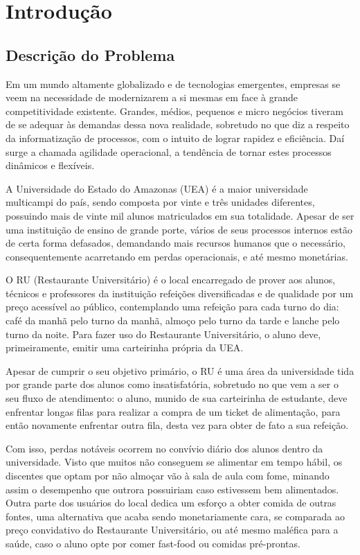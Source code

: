 \chapter{Introdução}


\section{Descrição do Problema}

Em um mundo altamente globalizado e de tecnologias emergentes, empresas se veem na necessidade de modernizarem a si mesmas em face à grande competitividade existente. Grandes, médios, pequenos e micro negócios tiveram de se adequar às demandas dessa nova realidade, sobretudo no que diz a respeito da informatização de processos, com o intuito de lograr rapidez e eficiência. Daí surge a chamada agilidade operacional, a tendência de tornar estes processos dinâmicos e flexíveis.

A Universidade do Estado do Amazonas (UEA) é a maior universidade multicampi do país, sendo composta por vinte e três unidades diferentes, possuindo mais de vinte mil alunos matriculados em sua totalidade. Apesar de ser uma instituição de ensino de grande porte, vários de seus processos internos estão de certa forma defasados, demandando mais recursos humanos que o necessário, consequentemente acarretando em perdas operacionais, e até mesmo monetárias. 

O RU (Restaurante Universitário) é o local encarregado de prover aos alunos, técnicos e professores da instituição refeições diversificadas e de qualidade por um preço acessível ao público, contemplando uma refeição para cada turno do dia: café da manhã pelo turno da manhã, almoço pelo turno da tarde e lanche pelo turno da noite. Para fazer uso do Restaurante Universitário, o aluno deve, primeiramente, emitir uma carteirinha própria da UEA.

Apesar de cumprir o seu objetivo primário, o RU é uma área da universidade tida por grande parte dos alunos como insatisfatória, sobretudo no que vem a ser o seu fluxo de atendimento: o aluno, munido de sua carteirinha de estudante, deve enfrentar longas filas para realizar a compra de um ticket de alimentação, para então novamente enfrentar outra fila, desta vez para obter de fato a sua refeição.

Com isso, perdas notáveis ocorrem no convívio diário dos alunos dentro da universidade. Visto que muitos não conseguem se alimentar em tempo hábil, os discentes que optam por não almoçar vão à sala de aula com fome, minando assim o desempenho que outrora possuiriam caso estivessem bem alimentados. Outra parte dos usuários do local dedica um esforço a obter comida de outras fontes, uma alternativa que acaba sendo monetariamente cara, se comparada ao preço convidativo do Restaurante Universitário, ou até mesmo maléfica para a saúde, caso o aluno opte por comer fast-food ou comidas pré-prontas.

